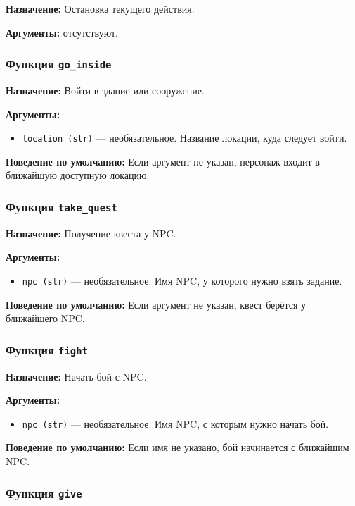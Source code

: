 \documentclass[14pt]{extarticle}
\begin{document}
\textbf{Назначение:} Остановка текущего действия.

\textbf{Аргументы:} отсутствуют.

\subsubsection{Функция \texttt{go\_inside}}

\textbf{Назначение:} Войти в здание или сооружение.

\textbf{Аргументы:}
\begin{itemize}
    \item \texttt{location (str)} --- необязательное. Название локации, куда следует войти.
\end{itemize}

\textbf{Поведение по умолчанию:} Если аргумент не указан, персонаж входит в ближайшую доступную локацию.

\subsubsection{Функция \texttt{take\_quest}}

\textbf{Назначение:} Получение квеста у NPC.

\textbf{Аргументы:}
\begin{itemize}
    \item \texttt{npc (str)} --- необязательное. Имя NPC, у которого нужно взять задание.
\end{itemize}

\textbf{Поведение по умолчанию:} Если аргумент не указан, квест берётся у ближайшего NPC.

\subsubsection{Функция \texttt{fight}}

\textbf{Назначение:} Начать бой с NPC.

\textbf{Аргументы:}
\begin{itemize}
    \item \texttt{npc (str)} --- необязательное. Имя NPC, с которым нужно начать бой.
\end{itemize}

\textbf{Поведение по умолчанию:} Если имя не указано, бой начинается с ближайшим NPC.

\subsubsection{Функция \texttt{give}}
\end{document}
